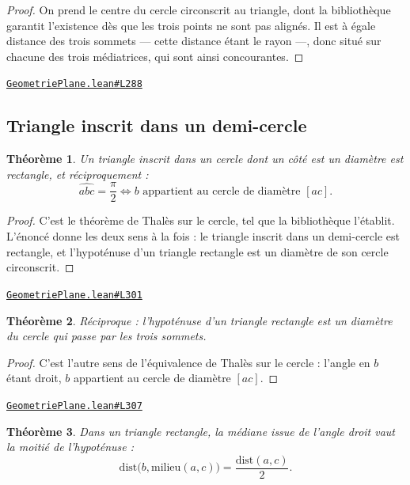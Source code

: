 \documentclass[11pt,a4paper]{article}
\theoremstyle{definition}
\theoremstyle{plain}
\newtheorem{theoreme}{Théorème}
\newcommand{\source}[2]{\par\smallskip\noindent\hfill{\footnotesize\href{#1}{\texttt{#2}}}\par\smallskip}
\begin{document}
\begin{proof}
On prend le centre du cercle circonscrit au triangle, dont la bibliothèque garantit
l'existence dès que les trois points ne sont pas alignés. Il est à égale distance des trois
sommets — cette distance étant le rayon —, donc situé sur chacune des trois médiatrices,
qui sont ainsi concourantes.
\end{proof}
\source{https://github.com/Commutator-IO/learn-lean/blob/main/cours/01-college/02-geometrie-plane/GeometriePlane.lean\#L288}{GeometriePlane.lean\#L288}

\subsection{Triangle inscrit dans un demi-cercle}

\begin{theoreme}
Un triangle inscrit dans un cercle dont un côté est un diamètre est rectangle, et
réciproquement :
\[ \widehat{abc} = \frac{\pi}{2} \iff b \text{ appartient au cercle de diamètre } [ac] . \]
\end{theoreme}

\begin{proof}
C'est le théorème de Thalès sur le cercle, tel que la bibliothèque l'établit. L'énoncé
donne les deux sens à la fois : le triangle inscrit dans un demi-cercle est rectangle, et
l'hypoténuse d'un triangle rectangle est un diamètre de son cercle circonscrit.
\end{proof}
\source{https://github.com/Commutator-IO/learn-lean/blob/main/cours/01-college/02-geometrie-plane/GeometriePlane.lean\#L301}{GeometriePlane.lean\#L301}

\begin{theoreme}
Réciproque : l'hypoténuse d'un triangle rectangle est un diamètre du cercle qui passe
par les trois sommets.
\end{theoreme}

\begin{proof}
C'est l'autre sens de l'équivalence de Thalès sur le cercle : l'angle en $b$ étant
droit, $b$ appartient au cercle de diamètre $[ac]$.
\end{proof}
\source{https://github.com/Commutator-IO/learn-lean/blob/main/cours/01-college/02-geometrie-plane/GeometriePlane.lean\#L307}{GeometriePlane.lean\#L307}

\begin{theoreme}
Dans un triangle rectangle, la médiane issue de l'angle droit vaut la moitié de
l'hypoténuse :
\[ \mathrm{dist}\bigl(b, \text{milieu}(a,c)\bigr) = \frac{\mathrm{dist}(a,c)}{2} . \]
\end{theoreme}
\end{document}
